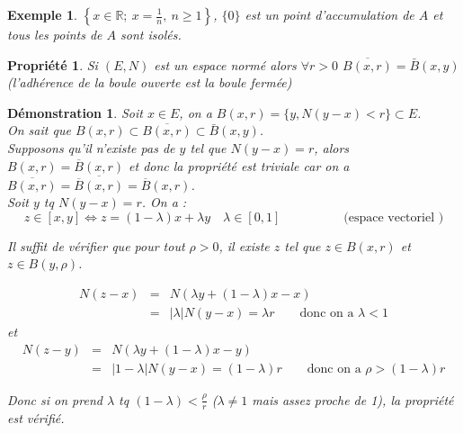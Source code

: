 \documentclass[a4paper, oneside]{report}
\theoremstyle{break}
\newtheorem{propr}[thm]{Propriété}
\newtheorem{exem}[thm]{Exemple}
\newtheorem*{demo}{Démonstration}
\newcommand{\R}{\mathbb{R}}
\newcommand{\ev}{espace vectoriel }
\newcommand{\fracun}[1]{\frac{1}{#1}}
\begin{document}
\begin{exem}
$\left\{x\in \R;~x=\fracun{n},~ n \geq 1 \right\}$, $\{0\}$ est un point d'accumulation de $A$ et tous les points de $A$ sont isolés.
\end{exem}



\begin{propr}
\label{prop_1}
Si $(E,N)$ est un espace normé alors $\forall r>0$ $\overline{B(x,r)}=\bar{B}(x,y)$ (l'adhérence de la boule ouverte est la boule fermée)
\end{propr}



\begin{demo}
Soit $x\in E$, on a $B(x,r) = \{y, N(y-x) <r \} \subset E$.\\
On sait que $B(x,r)\subset \overline{B(x,r)}\subset \bar{B}(x,y)$.\\

Supposons qu'il n'existe pas de $y$ tel que $N(y-x)=r$, alors $B(x,r) = \overline{B}(x,r)$ et donc la propriété est triviale car on a $\overline{B(x,r)}=\overline{\overline{B}(x,r)}=\overline{B}(x,r)$.\\

Soit $y$ tq $N(y-x)=r$.
On a :
$$z\in [x,y] \Leftrightarrow z=(1-\lambda)x+\lambda y\hspace{1em}\lambda \in [0,1]\hspace{5em} \text{(\ev)}$$

Il suffit de vérifier que pour tout $\rho>0$, il existe $z$ tel que $z\in B(x,r)$ et $z\in B(y,\rho)$.

$$\begin{array}{lll}
N(z-x)&=& N(\lambda y + (1-\lambda)x -x)\\
&=&|\lambda| N(y-x)= \lambda r \hspace{2em}\text{donc on a }\lambda < 1
\end{array}$$
et
$$\begin{array}{lll}
N(z-y)&=& N(\lambda y + (1-\lambda)x -y)\\
&=&|1- \lambda| N(y-x)= (1-\lambda) r \hspace{2em}\text{donc on a }\rho>(1-\lambda)r
\end{array}$$

Donc si on prend $\lambda$ tq $(1-\lambda) < \frac{\rho}{r}$ ($\lambda \neq 1$ mais assez proche de 1), la propriété est vérifié.
\end{demo}
\end{document}
